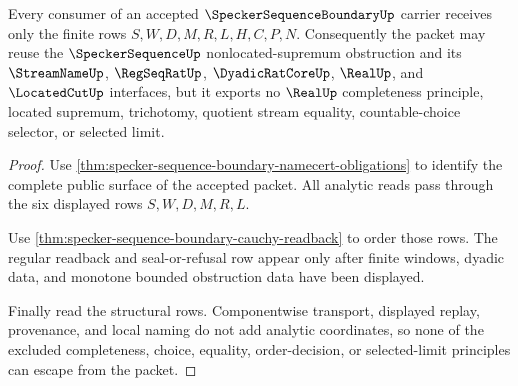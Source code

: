 \begin{theorem}\label{thm:specker-sequence-boundary-nonescape}
Every consumer of an accepted $\SpeckerSequenceBoundaryUp$ carrier receives only the finite rows $S,W,D,M,R,L,H,C,P,N$. Consequently the packet may reuse the $\SpeckerSequenceUp$ nonlocated-supremum obstruction and its $\StreamNameUp$, $\RegSeqRatUp$, $\DyadicRatCoreUp$, $\RealUp$, and $\LocatedCutUp$ interfaces, but it exports no $\RealUp$ completeness principle, located supremum, trichotomy, quotient stream equality, countable-choice selector, or selected limit.
\end{theorem}
\begin{proof}
Use \autoref{thm:specker-sequence-boundary-namecert-obligations} to identify the complete public surface of the accepted packet. All analytic reads pass through the six displayed rows $S,W,D,M,R,L$.

Use \autoref{thm:specker-sequence-boundary-cauchy-readback} to order those rows. The regular readback and seal-or-refusal row appear only after finite windows, dyadic data, and monotone bounded obstruction data have been displayed.

Finally read the structural rows. Componentwise transport, displayed replay, provenance, and local naming do not add analytic coordinates, so none of the excluded completeness, choice, equality, order-decision, or selected-limit principles can escape from the packet.
\end{proof}

